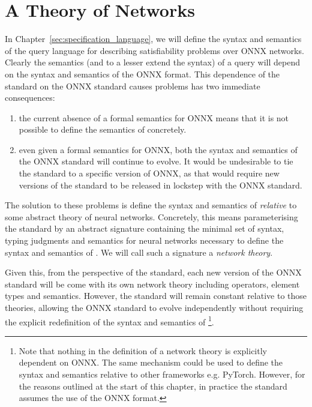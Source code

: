 \section{A Theory of Networks}

In Chapter~\ref{sec:specification_language}, we will define the syntax and semantics of the \vnnlib{} query language for describing satisfiability problems over ONNX networks.
Clearly the semantics (and to a lesser extend the syntax) of a query will depend on the syntax and semantics of the ONNX format.
This dependence of the \vnnlib{} standard on the ONNX standard causes problems has two immediate consequences:
\begin{enumerate}
\item the current absence of a formal semantics for ONNX means that it is not possible to define the semantics of \vnnlib{} concretely.
\item even given a formal semantics for ONNX, both the syntax and semantics of the ONNX standard will continue to evolve. 
It would be undesirable to tie the \vnnlib{} standard to a specific version of ONNX, as that would require new versions of the \vnnlib{} standard to be released in lockstep with the ONNX standard.
\end{enumerate}
The solution to these problems is define the syntax and semantics of \vnnlib{} \emph{relative} to some abstract theory of neural networks.
Concretely, this means parameterising the \vnnlib{} standard by an abstract signature containing the minimal set of syntax, typing judgments and semantics for neural networks necessary to define the syntax and semantics of \vnnlib{}. 
We will call such a signature a \emph{network theory}. 

Given this, from the perspective of the \vnnlib{} standard, each new version of the ONNX standard will be come with its own network theory including operators, element types and semantics. 
However, the \vnnlib{} standard will remain constant relative to those theories, allowing the ONNX standard to evolve independently without requiring the explicit redefinition of the syntax and semantics of \vnnlib{}\footnote{
Note that nothing in the definition of a network theory is explicitly dependent on ONNX. 
The same mechanism could be used to define the syntax and semantics relative to other frameworks e.g. PyTorch. 
However, for the reasons outlined at the start of this chapter, in practice the \vnnlib{} standard assumes the use of the ONNX format.
}.

